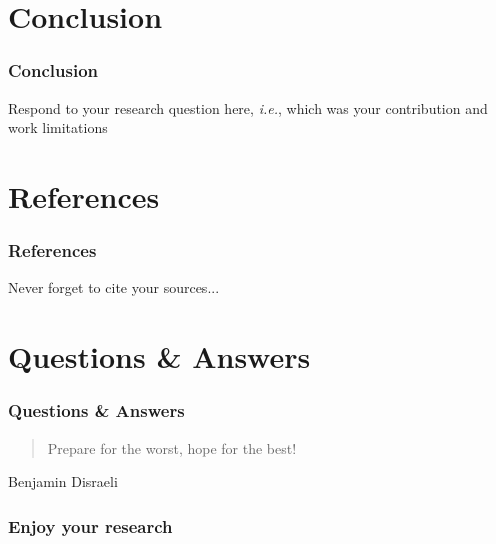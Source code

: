 \documentclass[10pt, aspectratio=169]{beamer}
\begin{document}
\section{Conclusion}
\begin{frame}
  \frametitle{Conclusion}
  Respond to your research question here, \emph{i.e.}, which was your
  contribution and work limitations
\end{frame}


\section{References}
\begin{frame}
  \frametitle{References}
  
  \scriptsize
  Never forget to cite your sources...
  
  \nocite{Ganssle:2000aa, Liu:1973aa, Douglass:2003aa}
  
  \setlength\bibitemsep{\baselineskip}
  \renewcommand*{\bibfont}{\scriptsize}
  \printbibliography
\end{frame}

\section{Questions \& Answers}
\begin{frame}
  \frametitle{Questions \& Answers}

  \begin{quotation}
  Prepare for the worst, hope for the best!\\    
  \end{quotation}
  \flushright
  Benjamin Disraeli
\end{frame}

\begin{frame}
  \frametitle{Enjoy your research}
  
\end{frame}
\end{document}
